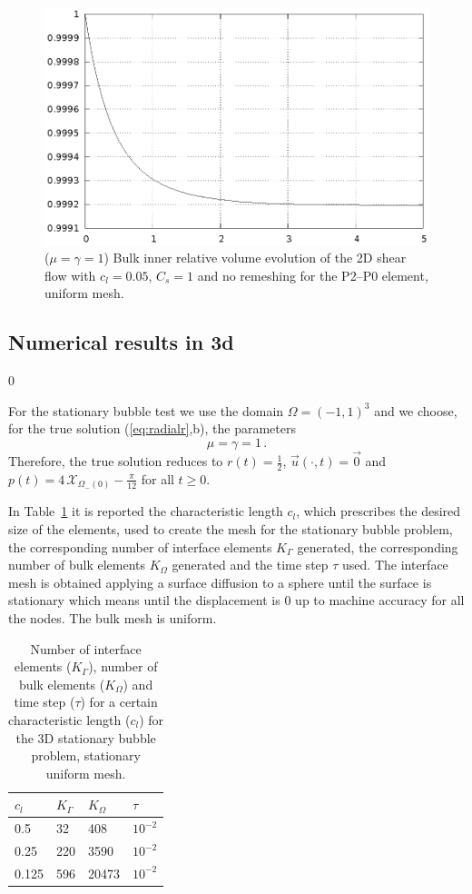 \documentclass[a4paper,12pt,onecolumn]{article}
\newcommand{\bigchi}{\ensuremath{\mathrm{\mathcal{X}}}}
\newcommand{\charfcn}[1]{\bigchi_{#1}} %
\begin{document}
\begin{figure}[htbp]
  \centering
  \includegraphics[width=.45\textwidth]
  {figures/2d_shear_smooth_bulk_inner_volume.ps}
  \caption{($\mu=\gamma=1$) Bulk inner relative volume evolution of the 2D
shear flow with $c_l=0.05$, $C_s=1$ and no remeshing for the P2--P0 element,
uniform mesh.}
  \label{fig:shear_2d_smooth_bulk_inner_volume}
\end{figure}

\subsection{Numerical results in 3d} \label{subsec:numerical_results_3d}
\setcounter{equation} 0

For the stationary bubble test we use the domain $\Omega = (-1,1)^3$ and we
choose, for the true solution (\ref{eq:radialr},b), the parameters
\begin{equation*}
\mu = \gamma = 1\,.
\end{equation*}
Therefore, the true solution reduces to $r(t) = \frac{1}{2}$, $\vec u(\cdot, t)
= \vec 0$ and $p(t) = 4\,\charfcn{\Omega_-(0)} - \frac{\pi}{12}$ for all
$t\geq0$.

In Table~\ref{tab:bubble3Delements} it is reported the characteristic length
$c_l$, which prescribes the desired size of the elements, used to create the
mesh for the stationary bubble problem, the corresponding number of interface
elements $K_\Gamma$ generated, the corresponding number of bulk elements
$K_\Omega$ generated and the time step $\tau$ used. The interface mesh is
obtained applying a surface diffusion to a sphere until the surface is
stationary which means until the displacement is 0 up to machine accuracy for
all the nodes. The bulk mesh is uniform.
\begin{table}
 \center
\begin{tabular}{llll}
\hline
$c_l$ & $K_\Gamma$ & $K_\Omega$ & $\tau$ \\
\hline
0.5 & 32 & 408 & $10^{-2}$ \\
0.25 & 220 & 3590 & $10^{-2}$\\
0.125 & 596 & 20473 & $10^{-2}$\\
\hline
\end{tabular}
\caption{Number of interface elements ($K_\Gamma$), number of bulk elements
($K_\Omega$) and time step ($\tau$) for a certain characteristic length ($c_l$)
for the 3D stationary bubble problem, stationary uniform mesh.}
\label{tab:bubble3Delements}
\end{table}
\end{document}
